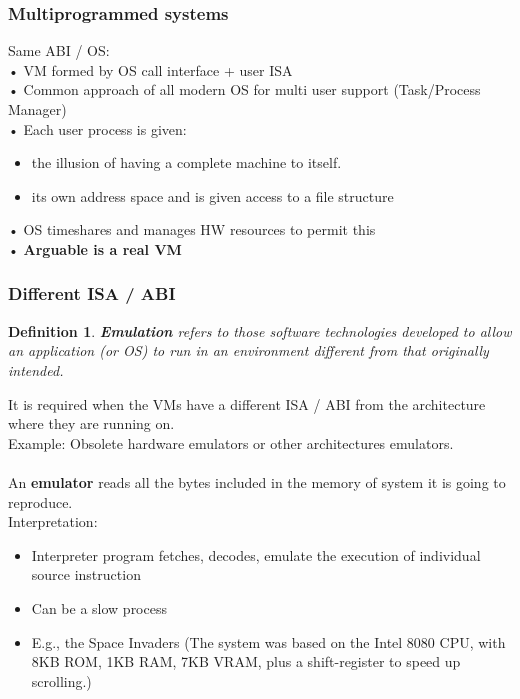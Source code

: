 \documentclass[10pt, oneside]{article}
\newtheorem{defn}{Definition}
\begin{document}
\subsubsection*{Multiprogrammed systems}
Same ABI / OS:\\
• VM formed by OS call interface + user ISA\\
• Common approach of all modern OS for multi user support (Task/Process Manager)\\
• Each user process is given:
\begin{itemize}
    \item the illusion of having a complete machine to itself.
    \item its own address space and is given access to a file structure
\end{itemize}
• OS timeshares and manages HW resources to permit this\\
• {\bf Arguable is a real VM}
\subsubsection*{Different ISA / ABI}
\begin{defn}
    {\bf Emulation} refers to those software technologies developed to allow an application (or OS) to run in an environment different from that originally intended.
\end{defn}It is required when the VMs have a different ISA / ABI from the architecture where they are running on.\\Example: Obsolete hardware emulators or other architectures emulators.\\\\
An {\bf emulator} reads all the bytes included in the memory of system it is going to reproduce.\\
Interpretation:
\begin{itemize}
    \item Interpreter program fetches, decodes, emulate the execution of individual source instruction
    \item Can be a slow process
    \item E.g., the Space Invaders (The system was based on the Intel 8080 CPU, with 8KB ROM, 1KB RAM, 7KB VRAM, plus a shift-register to speed up scrolling.)
\end{itemize}
\newpage
\end{document}
